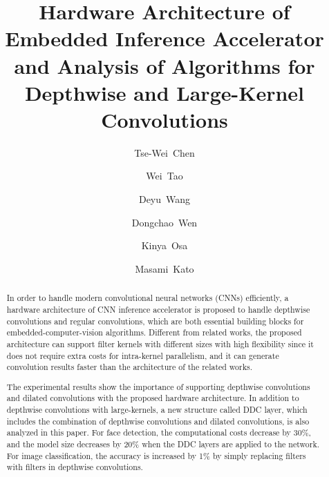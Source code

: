 \documentclass[runningheads]{llncs}
\begin{document}
\pagestyle{headings}
\mainmatter
\def\ECCVSubNumber{1}  

\title{Hardware Architecture of Embedded Inference Accelerator and Analysis of Algorithms for Depthwise and Large-Kernel Convolutions} 



\author{Tse-Wei~Chen \and
Wei~Tao \and
Deyu~Wang \and
Dongchao~Wen  \and
Kinya~Osa  \and
Masami~Kato
}
\maketitle

\begin{abstract}
In order to handle modern convolutional neural networks (CNNs) efficiently, a hardware architecture of CNN inference accelerator is proposed to handle depthwise convolutions and regular convolutions, which are both essential building blocks for embedded-computer-vision algorithms. Different from related works, the proposed architecture can support filter kernels with different sizes with high flexibility since it does not require extra costs for intra-kernel parallelism, and it can generate convolution results faster than the architecture of the related works. 

The experimental results show the importance of supporting depthwise convolutions and dilated convolutions with the proposed hardware architecture. In addition to depthwise convolutions with large-kernels, a new structure called DDC layer, which includes the combination of depthwise convolutions and dilated convolutions, is also analyzed in this paper. For face detection, the computational costs decrease by 30\%, and the model size decreases by 20\% when the DDC layers are applied to the network. For image classification, the accuracy is increased by 1\% by simply replacing  filters with  filters in depthwise convolutions.

\end{abstract}
\end{document}
